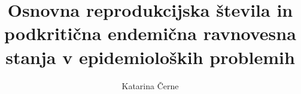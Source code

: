 \documentclass[11pt]{beamer}
\title{Osnovna reprodukcijska števila in podkritična endemična ravnovesna stanja v epidemioloških problemih}
\author{Katarina Černe}
\begin{document}
\begin{frame}
\maketitle
\end{frame}
\end{document}
